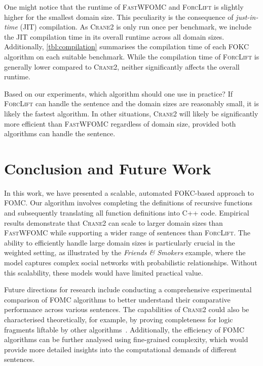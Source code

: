 \documentclass[a4paper,UKenglish,cleveref,autoref,table]{lipics-v2021}
\newcommand{\Cranetwo}{\textsc{Crane2}}
\newcommand{\friends}{\emph{Friends \& Smokers}}
\begin{document}
One might notice that the runtime of \textsc{FastWFOMC} and \textsc{ForcLift} is
slightly higher for the smallest domain size. This peculiarity is the
consequence of \emph{just-in-time} (JIT) compilation. As \Cranetwo{} is only run
once per benchmark, we include the JIT compilation time in its overall runtime
across all domain sizes. Additionally, \cref{tbl:compilation} summarises the
compilation time of each FOKC algorithm on each suitable benchmark. While the
compilation time of \textsc{ForcLift} is generally lower compared to
\Cranetwo{}, neither significantly affects the overall runtime.

Based on our experiments, which algorithm should one use in practice? If
\textsc{ForcLift} can handle the sentence and the domain sizes are reasonably
small, it is likely the fastest algorithm. In other situations, \Cranetwo{} will
likely be significantly more efficient than \textsc{FastWFOMC} regardless of
domain size, provided both algorithms can handle the sentence.

\section{Conclusion and Future Work}\label{sec:conclusion}

In this work, we have presented a scalable, automated FOKC-based approach to
FOMC\@. Our algorithm involves completing the definitions of recursive functions
and subsequently translating all function definitions into C++ code. Empirical
results demonstrate that \Cranetwo{} can scale to larger domain sizes than
\textsc{FastWFOMC} while supporting a wider range of sentences than
\textsc{ForcLift}. The ability to efficiently handle large domain sizes is
particularly crucial in the weighted setting, as illustrated by the \friends{}
example, where the model captures complex social networks with probabilistic
relationships. Without this scalability, these models would have limited
practical value.

Future directions for research include conducting a comprehensive experimental
comparison of FOMC algorithms to better understand their comparative performance
across various sentences. The capabilities of \Cranetwo{} could also be
characterised theoretically, for example, by proving completeness for logic
fragments liftable by other
algorithms~\cite{DBLP:journals/jair/Kuzelka21,DBLP:conf/aaai/TothK23,DBLP:journals/ai/BremenK23}.
Additionally, the efficiency of FOMC algorithms can be further analysed using
fine-grained complexity, which would provide more detailed insights into the
computational demands of different sentences.


\end{document}
